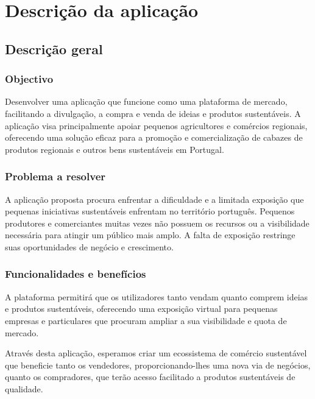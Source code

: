 \section{Descrição da aplicação} \label{section: descricao}

\subsection{Descrição geral}

\subsubsection{Objectivo}
Desenvolver uma aplicação que funcione como uma plataforma de mercado, facilitando a divulgação, a compra e venda de ideias e produtos sustentáveis. 
A aplicação visa principalmente apoiar pequenos agricultores e comércios regionais, oferecendo uma solução eficaz para a promoção e comercialização de cabazes de produtos regionais e outros bens sustentáveis em Portugal.

\subsubsection{Problema a resolver}
A aplicação proposta procura enfrentar a dificuldade e a limitada exposição que pequenas iniciativas sustentáveis enfrentam no território português. 
Pequenos produtores e comerciantes muitas vezes não possuem os recursos ou a visibilidade necessária para atingir um público mais amplo. A falta de exposição restringe suas oportunidades de negócio e crescimento.

\subsubsection{Funcionalidades e benefícios}
A plataforma permitirá que os utilizadores tanto vendam quanto comprem ideias e produtos sustentáveis, oferecendo uma exposição virtual para pequenas empresas e particulares que procuram ampliar a sua visibilidade e quota de mercado. 
\par \vspace{6pt}
Através desta aplicação, esperamos criar um ecossistema de comércio sustentável que beneficie tanto os vendedores, proporcionando-lhes uma nova via de negócios, quanto os compradores, que terão acesso facilitado a produtos sustentáveis de qualidade.




\newpage


